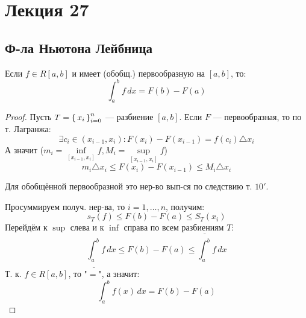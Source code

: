 \section{Лекция 27}
\subsection{Ф-ла Ньютона Лейбница}
\begin{theorem}
\label{th:27-Newton-Leibniz}
Если $f \in R[a, b]$ и имеет (обобщ.) первообразную на $[a, b]$, то:
\[
\int_{a}^{b} f \, dx = F(b) - F(a)
\]
\end{theorem}
\begin{proof}
Пусть $T = \set{x_i}_{i = 0}^{n}$ --- разбиение $[a, b]$. Если $F$ --- первообразная, то по т. Лагранжа:
\[
\exists c_i \in (x_{i - 1}, x_i) \colon F(x_i) - F(x_{i - 1}) = f(c_i) \triangle x_i
\]
А значит ($m_i = \underset{[x_{i - 1}, x_i]}{\inf} f, M_i = \underset{[x_{i - 1}, x_i]}{\sup} f$)
\[
m_i \triangle x_i \leq F(x_i) - F(x_{i - 1}) \leq M_i \triangle x_i
\]
\begin{note}
Для обобщённой первообразной это нер-во вып-ся по следствию т. $10'$.
\end{note}
Просуммируем получ. нер-ва, то $i = 1, \ldots, n$, получим:
\[
s_T(f) \leq F(b) - F(a) \leq S_T(x_i)
\]
Перейдём к $\sup$ слева и к $\inf$ справа по всем разбиениям $T$:
\[
\underline{\int_{a}^{b}} f \, dx \leq F(b) - F(a) \leq \overline{\int_{a}^{b}} f \, dx
\]
Т. к. $f \in R[a, b]$, то "$=$", а значит:
\[
\int_{a}^{b} f(x) \, dx = F(b) - F(a)
\]
\end{proof}
